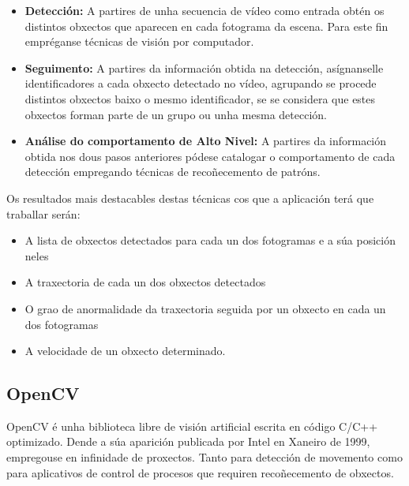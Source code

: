 	\begin{itemize}
	
		\item{\textbf{Detección:}} A partires de unha secuencia de vídeo como entrada obtén os 
		distintos obxectos que aparecen en cada fotograma da escena. Para este fin empréganse
		técnicas de visión por computador.
		
		
		\item{\textbf{Seguimento:}} A partires da información obtida na detección, asígnanselle 
		identificadores a cada obxecto detectado no vídeo, agrupando se procede distintos
		obxectos baixo o mesmo identificador, se se considera que estes obxectos forman
		parte de un grupo ou unha mesma detección.
		
		
		\item{\textbf{Análise do comportamento de Alto Nivel:}} A partires da información obtida nos 
		dous pasos anteriores pódese catalogar o comportamento de cada detección empregando
		técnicas de recoñecemento de patróns.
	
	\end{itemize}	
	
	Os resultados mais destacables destas técnicas cos que a aplicación terá que traballar serán:
	\begin{itemize}
		\item A lista de obxectos detectados para cada un dos fotogramas e a súa posición neles
		\item A traxectoria de cada un dos obxectos detectados
		\item O grao de anormalidade da traxectoria seguida por un obxecto en cada un dos fotogramas
		\item A velocidade de un obxecto determinado.
	\end{itemize}
	
	\subsection{OpenCV}
		OpenCV é unha biblioteca libre de visión artificial escrita en código C/C++ optimizado.
		Dende a súa aparición publicada por Intel en Xaneiro de 1999, empregouse en infinidade 
		de proxectos. Tanto para detección de movemento como para aplicativos de control de procesos
		que requiren recoñecemento de obxectos.
		
